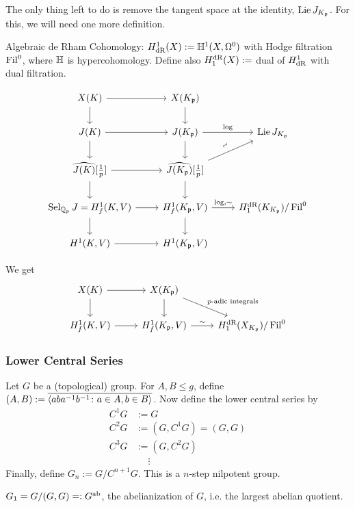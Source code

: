 
The only thing left to do is remove the tangent space at the identity, $\operatorname{Lie} J_{K_{\mathfrak{p}}}$. For this, we will need one more definition. 


Algebraic de Rham Cohomology: $H_{\text{dR}}^1(X):= \mathbb{H}^1(X,\Omega^0)$ with Hodge filtration $\operatorname{Fil}^0$, where $\mathbb{H}$ is hypercohomology. Define also $H_1^{\text{dR}}(X):=$ dual of $H_{\text{dR}}^1$ with dual filtration. 


	\[
	\begin{tikzcd}
	X(K) \arrow{d} \arrow{r} & X(K_\p) \arrow{d} \\
	J(K) \arrow{r} \arrow{d} & J(K_\p) \arrow{r}{\log} \arrow{d} & \lie J_{K_\p} \\
	\widehat{J(K)}[\frac{1}{p}] \arrow{r} \arrow{d} & \widehat{J(K_\p)}[\frac{1}{p}] \arrow{ur}{\rotatebox{45}{$\sim$}} \arrow{d} \\
	\sel_{\Qp} J \arrow{d}= H_f^1(K,V) \arrow{r} &  H_f^1(K_\p,V) \arrow{d} \arrow{r}{\log, \sim} &  H_1^\dr(K_{K_\p})/\Fil^0 \\
	H^1(K,V) \arrow{r} & H^1(K_\p,V)
	\end{tikzcd}
	\]


We get 
	\[
	\begin{tikzcd}
	X(K) \arrow{r} \arrow{d} & X(K_\p) \arrow{d} \arrow{dr}{p\text{-adic integrals}} \\
	H_f^1(K,V) \arrow{r} &  H_f^1(K_\p,V) \arrow{r}{\sim} & H_1^\dr(X_{K_\p})/\Fil^0
	\end{tikzcd}
	\]



\subsubsection{Lower Central Series}

Let $G$ be a (topological) group. For $A, B \leq g$, define $(A,B):= \overline{\langle aba^{-1}b^{-1} \colon a \in A, b \in B \rangle}$. Now define the lower central series by
	\[
	\begin{aligned}
	C^1G&:= G \\
	C^2G&:= (G,C^1G)= (G,G) \\
	C^3G&:= (G,C^2G) \\
	&\phantom{=}\vdots
	\end{aligned}
	\]
Finally, define $G_n:= G/C^{n+1}G$. This is a $n$-step nilpotent group. 


\begin{ex}
$G_1= G/(G,G)=: G^{\text{ab}}$, the abelianization of $G$, i.e. the largest abelian quotient. 
\end{ex}


